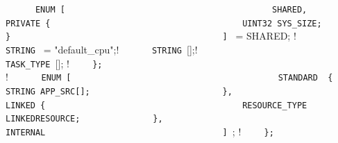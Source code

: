 {{{{{{{{{\lstinline!      ENUM [                                 ! \newline
\lstinline!        SHARED,                              ! \newline
\lstinline!        PRIVATE {                            ! \newline
\lstinline!          UINT32 SYS_SIZE;                   ! \newline
\lstinline!        }                                    ! \newline
\lstinline!      ] ! = SHARED;         ! \newline
\lstinline!      STRING ! = "default_cpu";! \newline
\lstinline!      STRING ![];! \newline
\lstinline!                                             ! \newline
\lstinline!      TASK_TYPE ![];       ! \newline
\lstinline!    };                                       ! \newline
\lstinline!                                             ! \newline
\lstinline!    ! {                  ! \newline
\lstinline!      ENUM [                                 ! \newline
\lstinline!        STANDARD  {                          ! \newline
\lstinline!	     STRING APP_SRC[];                  ! \newline   
\lstinline!        },                                   ! \newline
\lstinline!        LINKED {                             ! \newline
\lstinline!          RESOURCE_TYPE LINKEDRESOURCE;      ! \newline
\lstinline!        },                                   ! \newline
\lstinline!        INTERNAL                             ! \newline
\lstinline!      ] !;       ! \newline
\lstinline!    };                                       ! \newline
}}}}}}}}}}
